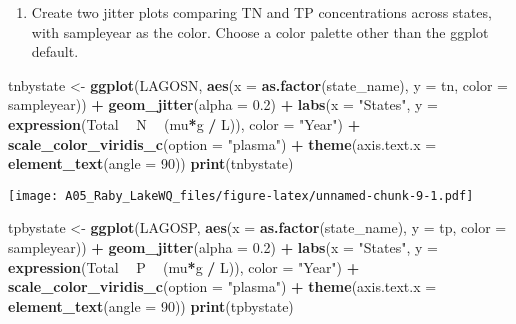 \documentclass[]{article}
\newenvironment{Shaded}{\begin{snugshade}}{\end{snugshade}}
\newcommand{\DataTypeTok}[1]{\textcolor[rgb]{0.13,0.29,0.53}{#1}}
\newcommand{\DecValTok}[1]{\textcolor[rgb]{0.00,0.00,0.81}{#1}}
\newcommand{\FloatTok}[1]{\textcolor[rgb]{0.00,0.00,0.81}{#1}}
\newcommand{\KeywordTok}[1]{\textcolor[rgb]{0.13,0.29,0.53}{\textbf{#1}}}
\newcommand{\NormalTok}[1]{#1}
\newcommand{\OperatorTok}[1]{\textcolor[rgb]{0.81,0.36,0.00}{\textbf{#1}}}
\newcommand{\StringTok}[1]{\textcolor[rgb]{0.31,0.60,0.02}{#1}}
\providecommand{\tightlist}{%
  \setlength{\itemsep}{0pt}\setlength{\parskip}{0pt}}
\begin{document}
\begin{enumerate}
\def\labelenumi{\arabic{enumi}.}
\setcounter{enumi}{10}
\tightlist
\item
  Create two jitter plots comparing TN and TP concentrations across
  states, with sampleyear as the color. Choose a color palette other
  than the ggplot default.
\end{enumerate}

\begin{Shaded}
\begin{Highlighting}[]
\NormalTok{tnbystate <-}\StringTok{ }
\KeywordTok{ggplot}\NormalTok{(LAGOSN, }
       \KeywordTok{aes}\NormalTok{(}\DataTypeTok{x =} \KeywordTok{as.factor}\NormalTok{(state_name), }\DataTypeTok{y =}\NormalTok{ tn, }\DataTypeTok{color =}\NormalTok{ sampleyear)) }\OperatorTok{+}
\StringTok{  }\KeywordTok{geom_jitter}\NormalTok{(}\DataTypeTok{alpha =} \FloatTok{0.2}\NormalTok{) }\OperatorTok{+}
\StringTok{  }\KeywordTok{labs}\NormalTok{(}\DataTypeTok{x =} \StringTok{"States"}\NormalTok{, }\DataTypeTok{y =} \KeywordTok{expression}\NormalTok{(Total }\OperatorTok{~}\StringTok{ }\NormalTok{N }\OperatorTok{~}\StringTok{ }\NormalTok{(mu}\OperatorTok{*}\NormalTok{g }\OperatorTok{/}\StringTok{ }\NormalTok{L)), }\DataTypeTok{color =} \StringTok{"Year"}\NormalTok{) }\OperatorTok{+}
\StringTok{  }\KeywordTok{scale_color_viridis_c}\NormalTok{(}\DataTypeTok{option =} \StringTok{"plasma"}\NormalTok{) }\OperatorTok{+}
\StringTok{  }\KeywordTok{theme}\NormalTok{(}\DataTypeTok{axis.text.x =} \KeywordTok{element_text}\NormalTok{(}\DataTypeTok{angle =} \DecValTok{90}\NormalTok{))}
\KeywordTok{print}\NormalTok{(tnbystate)}
\end{Highlighting}
\end{Shaded}

\texttt{[image: A05\_Raby\_LakeWQ\_files/figure-latex/unnamed-chunk-9-1.pdf]}

\begin{Shaded}
\begin{Highlighting}[]
\NormalTok{tpbystate <-}\StringTok{ }
\KeywordTok{ggplot}\NormalTok{(LAGOSP, }
       \KeywordTok{aes}\NormalTok{(}\DataTypeTok{x =} \KeywordTok{as.factor}\NormalTok{(state_name), }\DataTypeTok{y =}\NormalTok{ tp, }\DataTypeTok{color =}\NormalTok{ sampleyear)) }\OperatorTok{+}
\StringTok{  }\KeywordTok{geom_jitter}\NormalTok{(}\DataTypeTok{alpha =} \FloatTok{0.2}\NormalTok{) }\OperatorTok{+}
\StringTok{  }\KeywordTok{labs}\NormalTok{(}\DataTypeTok{x =} \StringTok{"States"}\NormalTok{, }\DataTypeTok{y =} \KeywordTok{expression}\NormalTok{(Total }\OperatorTok{~}\StringTok{ }\NormalTok{P }\OperatorTok{~}\StringTok{ }\NormalTok{(mu}\OperatorTok{*}\NormalTok{g }\OperatorTok{/}\StringTok{ }\NormalTok{L)), }\DataTypeTok{color =} \StringTok{"Year"}\NormalTok{) }\OperatorTok{+}
\StringTok{  }\KeywordTok{scale_color_viridis_c}\NormalTok{(}\DataTypeTok{option =} \StringTok{"plasma"}\NormalTok{) }\OperatorTok{+}
\StringTok{  }\KeywordTok{theme}\NormalTok{(}\DataTypeTok{axis.text.x =} \KeywordTok{element_text}\NormalTok{(}\DataTypeTok{angle =} \DecValTok{90}\NormalTok{))}
\KeywordTok{print}\NormalTok{(tpbystate)}
\end{Highlighting}
\end{Shaded}
\end{document}

